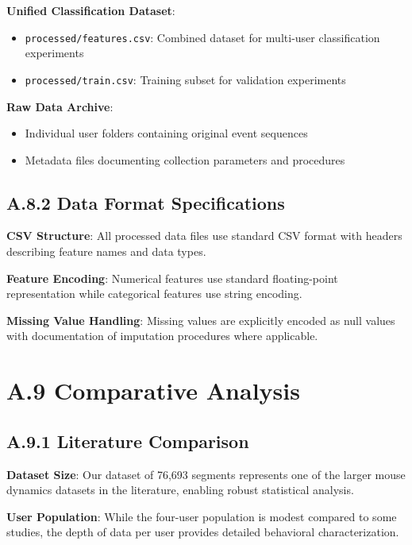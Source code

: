 \documentclass[
  12pt,
  a4paper,
]{report}
\providecommand{\tightlist}{%
  \setlength{\itemsep}{0pt}\setlength{\parskip}{0pt}}
\begin{document}
\textbf{Unified Classification Dataset}:

\begin{itemize}
\tightlist
\item
  \texttt{processed/features.csv}: Combined dataset for multi-user
  classification experiments
\item
  \texttt{processed/train.csv}: Training subset for validation
  experiments
\end{itemize}

\textbf{Raw Data Archive}:

\begin{itemize}
\tightlist
\item
  Individual user folders containing original event sequences
\item
  Metadata files documenting collection parameters and procedures
\end{itemize}

\subsection{A.8.2 Data Format
Specifications}\label{a.8.2-data-format-specifications}

\textbf{CSV Structure}: All processed data files use standard CSV format
with headers describing feature names and data types.

\textbf{Feature Encoding}: Numerical features use standard
floating-point representation while categorical features use string
encoding.

\textbf{Missing Value Handling}: Missing values are explicitly encoded
as null values with documentation of imputation procedures where
applicable.

\section{A.9 Comparative Analysis}\label{a.9-comparative-analysis}

\subsection{A.9.1 Literature
Comparison}\label{a.9.1-literature-comparison}

\textbf{Dataset Size}: Our dataset of 76,693 segments represents one of
the larger mouse dynamics datasets in the literature, enabling robust
statistical analysis.

\textbf{User Population}: While the four-user population is modest
compared to some studies, the depth of data per user provides detailed
behavioral characterization.
\end{document}
